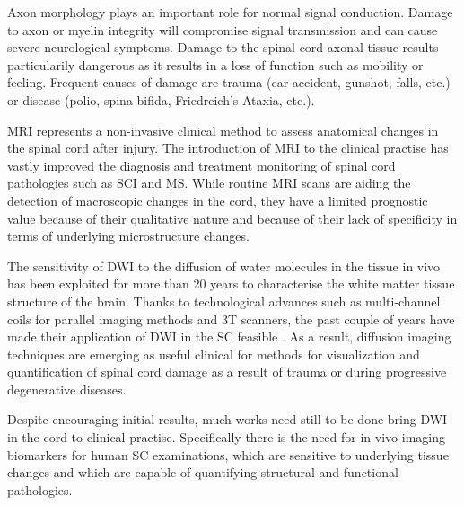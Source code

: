 Axon morphology plays an important role for normal signal conduction. Damage to axon or myelin integrity will compromise signal transmission and can cause severe neurological symptoms. Damage to the spinal cord axonal tissue results particularily dangerous as it results in a loss of function such as mobility or feeling. Frequent causes of damage are trauma (car accident, gunshot,  falls, etc.) or disease (polio, spina bifida, Friedreich's Ataxia, etc.). 

\Gls{MRI} represents a non-invasive clinical method to assess anatomical changes in the spinal cord after injury. The introduction of \gls{MRI} to the clinical practise has vastly improved the diagnosis and treatment monitoring of spinal cord pathologies such as \gls{SCI} and \gls{MS}. While routine \gls{MRI} scans are aiding the detection of macroscopic changes in the cord, they have a limited prognostic value because of their qualitative nature and because of their lack of specificity in terms of underlying microstructure changes. 

The sensitivity of {\gls{DWI}} to the diffusion of water molecules in the tissue in vivo has been exploited for more than 20 years to characterise the white matter tissue structure of the brain. Thanks to technological advances such as multi-channel coils for parallel imaging methods and 3T scanners, the past couple of years have made their application of \gls{DWI} in the {\gls{SC}} feasible \citep{CWK,Ellingson}. As a result, diffusion imaging techniques are emerging as useful clinical for methods for visualization and quantification of spinal cord damage as a result of trauma or during progressive degenerative diseases. 

Despite encouraging initial results, much works need still to be done bring \gls{DWI} in the cord to clinical practise. Specifically there is the need for in-vivo imaging biomarkers for human {\gls{SC}} examinations, which are sensitive to underlying tissue changes and which are capable of quantifying structural and functional pathologies.







